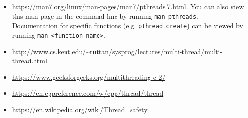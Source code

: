 \documentclass[a4paper,11pt]{article}
\newcommand{\code}[1]{\texttt{#1}}
\begin{document}
\begin{itemize}
    \item \url{https://man7.org/linux/man-pages/man7/pthreads.7.html}. You can
    also view this man page in the command line by running \code{man pthreads}.
    Documentation for specific functions (e.g. \code{pthread\_create}) can be
    viewed by running \code{man <function-name>}.
    \item \url{http://www.cs.kent.edu/~ruttan/sysprog/lectures/multi-thread/multi-thread.html}
    \item \url{https://www.geeksforgeeks.org/multithreading-c-2/}
    \item \url{https://en.cppreference.com/w/cpp/thread/thread}
    \item \url{https://en.wikipedia.org/wiki/Thread_safety}
\end{itemize}
\end{document}
